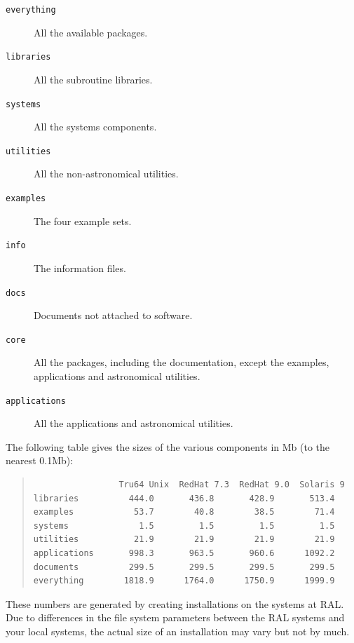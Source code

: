 \documentclass[twoside,11pt]{article}
\renewcommand{\_}{\texttt{\symbol{95}}}
\begin{document}
\begin{description}

\item[\texttt{everything}] All the available packages.

\item[\texttt{libraries}] All the subroutine libraries.

\item[\texttt{systems}] All the systems components.
 
\item[\texttt{utilities}] All the non-astronomical utilities.

\item[\texttt{examples}] The four example sets.

\item[\texttt{info}] The information files.

\item[\texttt{docs}] Documents not attached to software. 

\item[\texttt{core}] All the packages, including the documentation, except
the examples, applications and astronomical utilities. 

\item[\texttt{applications}] All the applications and astronomical
utilities. 
 
\end{description}

The following table gives the sizes of the various components in Mb (to
the nearest 0.1Mb):

\begin{quote}
\begin{verbatim}
                 Tru64 Unix  RedHat 7.3  RedHat 9.0  Solaris 9
libraries          444.0       436.8       428.9       513.4
examples            53.7        40.8        38.5        71.4
systems              1.5         1.5         1.5         1.5
utilities           21.9        21.9        21.9        21.9 
applications       998.3       963.5       960.6      1092.2
documents          299.5       299.5       299.5       299.5
everything        1818.9      1764.0      1750.9      1999.9
\end{verbatim}
\end{quote}

These numbers are generated by creating installations on the systems at
RAL. Due to differences in the file system parameters between the RAL
systems and your local systems, the actual size of an installation may
vary but not by much.
\end{document}
